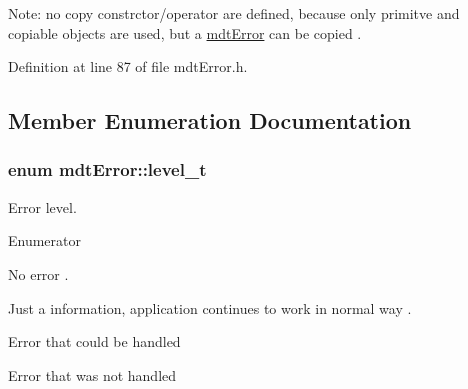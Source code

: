 Note\-: no copy constrctor/operator are defined, because only primitve and copiable objects are used, but a \hyperlink{classmdt_error}{mdt\-Error} can be copied . 

Definition at line 87 of file mdt\-Error.\-h.



\subsection{Member Enumeration Documentation}
\hypertarget{classmdt_error_a5c8b1a040e2feaa848f6201d6b6f0cd7}{
\subsubsection[{level\-\_\-t}]{\setlength{\rightskip}{0pt plus 5cm}enum {\bf mdt\-Error\-::level\-\_\-t}}}\label{classmdt_error_a5c8b1a040e2feaa848f6201d6b6f0cd7}


Error level. 

\begin{Desc}
\item[Enumerator]\par
\begin{description}
\item[{\em 
\hypertarget{classmdt_error_a5c8b1a040e2feaa848f6201d6b6f0cd7a1ba619a7f332d8fe18fb3cd270ff86eb}{No\-Error}\label{classmdt_error_a5c8b1a040e2feaa848f6201d6b6f0cd7a1ba619a7f332d8fe18fb3cd270ff86eb}
}]No error . \item[{\em 
\hypertarget{classmdt_error_a5c8b1a040e2feaa848f6201d6b6f0cd7a24688d5f5af0a3a54636fa1a4b2f60fc}{Info}\label{classmdt_error_a5c8b1a040e2feaa848f6201d6b6f0cd7a24688d5f5af0a3a54636fa1a4b2f60fc}
}]Just a information, application continues to work in normal way . \item[{\em 
\hypertarget{classmdt_error_a5c8b1a040e2feaa848f6201d6b6f0cd7a61d92805e90226faf3d1c5fd350a0ab8}{Warning}\label{classmdt_error_a5c8b1a040e2feaa848f6201d6b6f0cd7a61d92805e90226faf3d1c5fd350a0ab8}
}]Error that could be handled \item[{\em 
\hypertarget{classmdt_error_a5c8b1a040e2feaa848f6201d6b6f0cd7a35f5c05a7d15b6433445cdbffa6d5260}{Error}\label{classmdt_error_a5c8b1a040e2feaa848f6201d6b6f0cd7a35f5c05a7d15b6433445cdbffa6d5260}
}]Error that was not handled \end{description}
\end{Desc}


